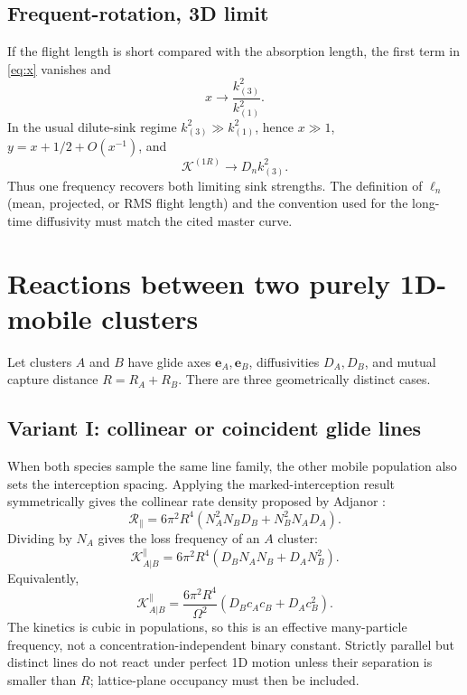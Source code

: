 \documentclass[11pt]{article}
\newcommand{\KK}{\mathcal{K}}
\newcommand{\Rcal}{\mathcal{R}}
\begin{document}
\subsection{Frequent-rotation, 3D limit}
If the flight length is short compared with the absorption length, the first
term in \cref{eq:x} vanishes and
\begin{equation}
 x\longrightarrow\frac{k^2_{(3)}}{k^2_{(1)}}.
\end{equation}
In the usual dilute-sink regime \(k^2_{(3)}\gg k^2_{(1)}\), hence \(x\gg1\),
\(y=x+1/2+O(x^{-1})\), and
\begin{equation}
 \boxed{\KK^{(1R)}\longrightarrow D_nk^2_{(3)}}.   \label{eq:3d-limit}
\end{equation}
Thus one frequency recovers both limiting sink strengths. The definition of
\(\ell_n\) (mean, projected, or RMS flight length) and the convention used for
the long-time diffusivity must match the cited master curve.

\section{Reactions between two purely 1D-mobile clusters}
Let clusters \(A\) and \(B\) have glide axes \(\bm e_A,\bm e_B\), diffusivities
\(D_A,D_B\), and mutual capture distance \(R=R_A+R_B\). There are three
geometrically distinct cases.

\subsection{Variant I: collinear or coincident glide lines}
When both species sample the same line family, the other mobile population
also sets the interception spacing. Applying the marked-interception result
symmetrically gives the collinear rate density proposed by Adjanor
\cite{Adjanor2022}:
\begin{equation}
 \Rcal_{\parallel}
 =6\pi^2R^4\left(N_A^2N_BD_B+N_B^2N_AD_A\right).  \label{eq:Rparallel}
\end{equation}
Dividing by \(N_A\) gives the loss frequency of an \(A\) cluster:
\begin{equation}
 \boxed{\KK_{A|B}^{\parallel}
 =6\pi^2R^4\left(D_BN_AN_B+D_AN_B^2\right).}       \label{eq:Kparallel}
\end{equation}
Equivalently,
\begin{equation}
 \boxed{\KK_{A|B}^{\parallel}
 =\frac{6\pi^2R^4}{\Omega^2}
 \left(D_Bc_Ac_B+D_Ac_B^2\right).}                \label{eq:Kparallel-af}
\end{equation}
The kinetics is cubic in populations, so this is an effective many-particle
frequency, not a concentration-independent binary constant. Strictly parallel
but distinct lines do not react under perfect 1D motion unless their
separation is smaller than \(R\); lattice-plane occupancy must then be
included.
\end{document}
